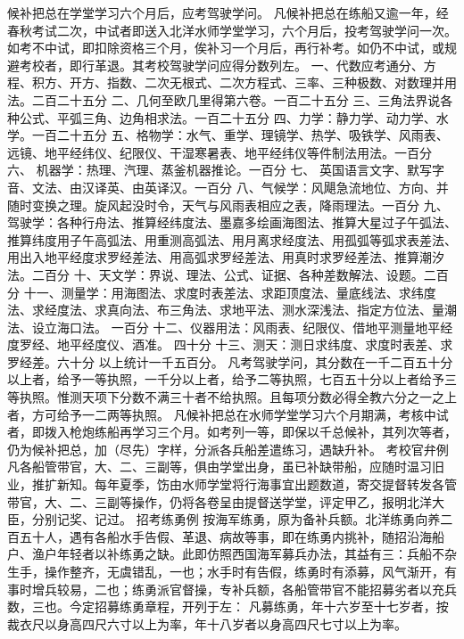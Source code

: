 \documentclass[12pt,UTF8]{ctexbook}
\begin{document}
候补把总在学堂学习六个月后，应考驾驶学问。
凡候补把总在练船又逾一年，经春秋考试二次，中试者即送入北洋水师学堂学习，六个月后，投考驾驶学问一次。如考不中试，即扣除资格三个月，俟补习一个月后，再行补考。如仍不中试，或规避考校者，即行革退。其考校驾驶学问应得分数列左。
一、代数应考通分、方程、积方、开方、指数、二次无根式、二次方程式、三率、三种极数、对数理并用法。二百二十五分
二、几何至欧几里得第六卷。一百二十五分
三、三角法界说各种公式、平弧三角、边角相求法。一百二十五分
四、力学：静力学、动力学、水学。一百二十五分
五、格物学：水气、重学、理镜学、热学、吸铁学、风雨表、远镜、地平经纬仪、纪限仪、干湿寒暑表、地平经纬仪等件制法用法。一百分
六、 机器学：热理、汽理、蒸釜机器推论。一百分
七、 英国语言文字、默写字音、文法、由汉译英、由英译汉。一百分
八、气候学：风飓急流地位、方向、并随时变换之理。旋风起没时令，天气与风雨表相应之表，降雨理法。一百分
九、驾驶学：各种行舟法、推算经纬度法、墨嘉多绘画海图法、推算大星过子午弧法、推算纬度用子午高弧法、用重测高弧法、用月离求经度法、用孤弧等弧求表差法、用出入地平经度求罗经差法、用高弧求罗经差法、用真时求罗经差法、推算潮汐法。二百分
十、天文学：界说、理法、公式、证据、各种差数解法、设题。二百分
十一、测量学：用海图法、求度时表差法、求距顶度法、量底线法、求纬度法、求经度法、求真向法、布三角法、求地平法、测水深浅法、指定方位法、量潮法、设立海口法。 一百分
十二、仪器用法：风雨表、纪限仪、借地平测量地平经度罗经、地平经度仪、酒准。 四十分
十三、测天：测日求纬度、求度时表差、求罗经差。六十分
以上统计一千五百分。
凡考驾驶学问，其分数在一千二百五十分以上者，给予一等执照，一千分以上者，给予二等执照，七百五十分以上者给予三等执照。惟测天项下分数不满三十者不给执照。且每项分数必得全教六分之一之上者，方可给予一二两等执照。
凡候补把总在水师学堂学习六个月期满，考核中试者，即拨入枪炮练船再学习三个月。如考列一等，即保以千总候补，其列次等者，仍为候补把总，加（尽先）字样，分派各兵船差遣练习，遇缺升补。
考校官弁例
凡各船管带官，大、二、三副等，俱由学堂出身，虽已补缺带船，应随时温习旧业，推扩新知。每年夏季，饬由水师学堂将行海事宜出题数道，寄交提督转发各管带官，大、二、三副等操作，仍将各卷呈由提督送学堂，评定甲乙，报明北洋大臣，分别记奖、记过。
招考练勇例
按海军练勇，原为备补兵额。北洋练勇向养二百五十人，遇有各船水手告假、革退、病故等事，即在练勇内挑补，随招沿海船户、渔户年轻者以补练勇之缺。此即仿照西国海军募兵办法，其益有三：兵船不杂生手，操作整齐，无虞错乱，一也；水手时有告假，练勇时有添募，风气渐开，有事时增兵较易，二也；练勇派官督操，专补兵额，各船管带官不能招募劣者以充兵数，三也。今定招募练勇章程，开列于左：
凡募练勇，年十六岁至十七岁者，按裁衣尺以身高四尺六寸以上为率，年十八岁者以身高四尺七寸以上为率。
\end{document}
